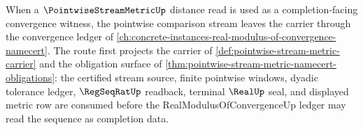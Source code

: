 When a $\PointwiseStreamMetricUp$ distance read is used as a completion-facing convergence witness, the pointwise comparison stream leaves the carrier through the convergence ledger of \autoref{ch:concrete-instances-real-modulus-of-convergence-namecert}. The route first projects the carrier of \autoref{def:pointwise-stream-metric-carrier} and the obligation surface of \autoref{thm:pointwise-stream-metric-namecert-obligations}: the certified stream source, finite pointwise windows, dyadic tolerance ledger, $\RegSeqRatUp$ readback, terminal $\RealUp$ seal, and displayed metric row are consumed before the RealModulusOfConvergenceUp ledger may read the sequence as completion data.
